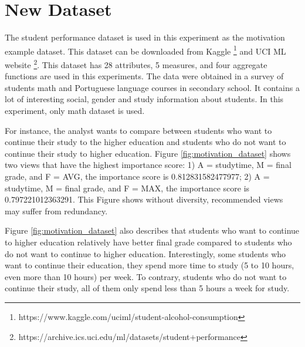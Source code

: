 \documentclass{article}
\begin{document}
\section{New Dataset}

The student performance dataset is used in this experiment as the motivation example dataset. This dataset can be downloaded from Kaggle \footnote{https://www.kaggle.com/uciml/student-alcohol-consumption} and UCI ML website \footnote{https://archive.ics.uci.edu/ml/datasets/student+performance}. This dataset has 28 attributes, 5 measures, and four aggregate functions are used in this experiments. The data were obtained in a survey of students math and Portuguese language courses in secondary school. It contains a lot of interesting social, gender and study information about students. In this experiment, only math dataset is used. 

For instance, the analyst wants to compare between students who want to continue their study to the higher education and students who do not want to continue their study to higher education. Figure \ref{fig:motivation_dataset} shows two views that have the highest importance score: 1) A = studytime, M = final grade, and F = AVG, the importance score is 0.812831582477977; 2) A = studytime, M = final grade, and F = MAX, the importance score is 0.797221012363291. This Figure shows without diversity, recommended views may suffer from redundancy. 


Figure \ref{fig:motivation_dataset} also describes that students who want to continue to higher education relatively have better final grade compared to students who do not want to continue to higher education. Interestingly, some students who want to continue their education, they spend more time to study (5 to 10 hours, even more than 10 hours) per week. To contrary, students who do not want to continue their study, all of them only spend less than 5 hours a week for study.
\end{document}
